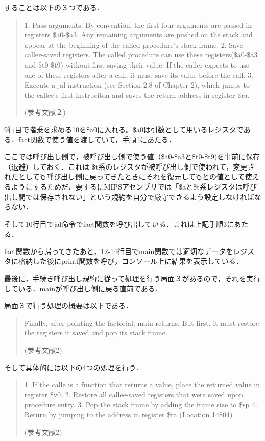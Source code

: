 \documentclass[a4j]{jarticle}
\begin{document}
することは以下の３つである．

\begin{quote}
1. Pass arguments. By convention, the first four arguments are passed in registers \$a0-\$a3. Any remaining arguments are pushed on the stack and appear at the beginning of the called procedure's stack frame.
2. Save caller-saved registers. The called procedure can use these registers(\$a0-\$a3 and \$t0-\$t9) without first saving their value. If the caller expects to use one of these registers after a call, it must save its value before the call.
3. Execute a jal instruction (see Section 2.8 of Chapter 2), which jumps to the callee's first instruciton and saves the return address in register \$ra.  

(参考文献２)
\end{quote}

9行目で階乗を求める10を\$a0に入れる。\$a0は引数として用いるレジスタである．fact関数で使う値を渡していて，手順1にあたる．

ここでは呼び出し側で，被呼び出し側で使う値（\$a0-\$a3と\$t0-\$t9)を事前に保存（退避）しておく．これは \$t系のレジスタが被呼び出し側で使われて，変更されたとしても呼び出し側に戻ってきたときにそれを復元してもとの値として使えるようにするためだ．要するにMIPSアセンブリでは「\$aと\$t系レジスタは呼び出し間では保存されない」という規約を自分で厳守できるよう設定しなければならない．

そして10行目でjal命令でfact関数を呼び出している．これは上記手順3にあたる．

fact関数から帰ってきたあと，12-14行目でmain関数では適切なデータをレジスタに格納した後にprintf関数を呼び，コンソール上に結果を表示している．

最後に，手続き呼び出し規約に従って処理を行う局面３があるので，それを実行している．mainが呼び出し側に戻る直前である．

局面３で行う処理の概要は以下である．


\begin{quote}
Finally, after pointing the factorial, main returns. But first, it must restore the registers it saved and pop its stack frame.

(参考文献2)
\end{quote}

そして具体的には以下の4つの処理を行う．

\begin{quote}
1. If the calle is a function that returns a value, place the returned value in register \$v0.
2. Restore all callee-saved registers that were saved upon procedure entry.
3. Pop the stack frame by adding the frame size to \$sp
4. Return by jumping to the address in register \$ra
(Location 14804)

(参考文献2)
\end{quote}
\end{document}
